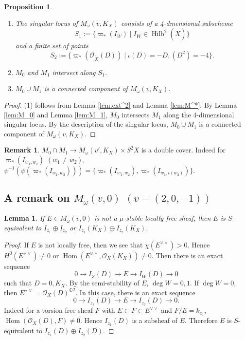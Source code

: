 \documentclass[leqno,11pt]{amsart}
\def\deg{\mathop{\mathrm{deg}}}
\def\Hilb{\mathop{\mathrm{Hilb}}\nolimits}
\def\Hom{\mathop{\mathrm{Hom}}\nolimits}
\newtheorem{Prop}[Thm]{Proposition}
\newtheorem{Lem}[Thm]{Lemma}
\theoremstyle{definition}
\newtheorem{Rem}[Thm]{Remark}
\def\OO{\ensuremath{\mathcal O}}
\def\cal{\mathcal}
\begin{document}
\begin{Prop}\label{prop:connected}
\begin{enumerate}
\item[(1)]
The singular locus of $M_\omega(v,K_X)$ consists of a 4-dmensional subscheme
$$
S_1:=\{ \varpi_*(I_W) \mid I_W \in \Hilb^2(\widetilde{X}) \} 
$$
and a finite set of points 
$$
S_2:=\{\varpi_*({\cal O}_{\widetilde{X}}(D)) \mid \iota(D)=-D, (D^2)=-4\}.
$$
\item[(2)]
$M_0$ and $M_1$
intersect along $S_1$.
\item[(3)]
$M_0 \cup M_1$ is a connected component of $M_\omega(v,K_X)$.
\end{enumerate}
\end{Prop}

\begin{proof}
(1) follows from Lemma \ref{lem:ext^2} and Lemma \ref{lem:M^*}. 
By Lemma \ref{lem:M_0} and Lemma \ref{lem:M_1},
$M_0$ intersects $M_1$ along the 4-dimensional singular locus.
By the description of the singular locus,
$M_0 \cup M_1$ is a connected component of
$M_\omega(v,K_X)$.
\end{proof}


\begin{Rem}
$M_0 \cap M_1 \to M_\omega(v',K_X) \times S^2 X$ is a double cover.
Indeed for $\varpi_*(I_{w_1,w_2})$ $(w_1 \ne w_2)$,
$\psi^{-1}(\psi(\varpi_*(I_{w_1,w_2})))=\{\varpi_*(I_{w_1,w_2}),\varpi_*(I_{w_1,\iota(w_2)})\}$.
\end{Rem}









\subsection{A remark on $M_\omega(v,0)$ $(v=(2,0,-1))$}
\begin{Lem}
If $E \in M_\omega(v,0)$ is not a $\mu$-stable locally free sheaf, then 
$E$ is $S$-equivalent to $I_{z_1} \oplus I_{z_2}$ or
$I_{z_1}(K_X) \oplus I_{z_2}(K_X)$.  
\end{Lem}

\begin{proof}
If $E$ is not locally free, then we see that
$\chi(E^{\vee \vee})>0$.
Hence $H^0(E^{\vee \vee}) \ne 0$ or
$\Hom(E^{\vee \vee},\OO_X(K_X)) \ne 0$.
Then there is an exact sequence
$$
0 \to I_Z(D) \to E \to I_W(D) \to 0
$$
such that $D=0,K_X$.
By the semi-stability of $E$,
$\deg W=0,1$.
If $\deg W=0$, then
$E^{\vee \vee}=\OO_X(D)^{\oplus 2}$.
In this case, there is an exact sequence
$$
0 \to I_{z_1}(D) \to E \to I_{z_2}(D) \to 0.
$$
Indeed for a torsion free sheaf $F$ with
$E \subset F \subset E^{\vee \vee}$ and $F/E=k_{z_1}$,
$\Hom(\OO_X(D),F) \ne 0$. 
Hence $I_{z_1}(D)$ is a subsheaf of $E$.
Therefore $E$ is $S$-equivalent to $I_{z_1}(D)\oplus I_{z_2}(D)$.
\end{proof}
\end{document}
